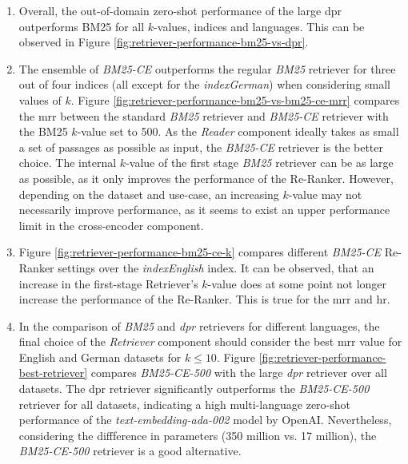 \begin{enumerate}
    \item Overall, the out-of-domain zero-shot performance of the large \gls{dpr} outperforms BM25 for all $k$-values, indices and languages. This can be observed in Figure \ref{fig:retriever-performance-bm25-vs-dpr}.
    \item The ensemble of \textit{BM25-CE} outperforms the regular \textit{BM25} retriever for three out of four indices (all except for the \textit{indexGerman}) when considering small values of $k$. Figure \ref{fig:retriever-performance-bm25-vs-bm25-ce-mrr} compares the \gls{mrr} between the standard \textit{BM25} retriever and \textit{BM25-CE} retriever with the BM25 $k$-value set to 500. As the \textit{Reader} component ideally takes as small a set of passages as possible as input, the \textit{BM25-CE} retriever is the better choice. The internal $k$-value of the first stage \textit{BM25} retriever can be as large as possible, as it only improves the performance of the Re-Ranker. However, depending on the dataset and use-case, an increasing $k$-value may not necessarily improve performance, as it seems to exist an upper performance limit in the cross-encoder component.
    \item Figure \ref{fig:retriever-performance-bm25-ce-k} compares different \textit{BM25-CE} Re-Ranker settings over the \textit{indexEnglish} index. It can be observed, that an increase in the first-stage Retriever's $k$-value does at some point not longer increase the performance of the Re-Ranker. This is true for the \gls{mrr} and \gls{hr}.
    
    \item In the comparison of \textit{BM25} and \textit{\gls{dpr}} retrievers for different languages, the final choice of the \textit{Retriever} component should consider the best \gls{mrr} value for English and German datasets for $k \leq 10$. Figure \ref{fig:retriever-performance-best-retriever} compares \textit{BM25-CE-500} with the large \textit{\gls{dpr}} retriever over all datasets. The \gls{dpr} retriever significantly outperforms the \textit{BM25-CE-500} retriever for all datasets, indicating a high multi-language zero-shot performance of the \textit{text-embedding-ada-002} model by OpenAI. Nevertheless, considering the diffference in parameters (350 million vs. 17 million), the \textit{BM25-CE-500} retriever is a good alternative.
\end{enumerate}

